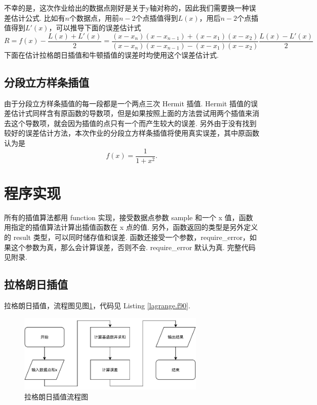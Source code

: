\documentclass{article}
\begin{document}
	不幸的是，这次作业给出的数据点刚好是关于y轴对称的，因此我们需要换一种误差估计公式. 比如有$n$个数据点，用前$n-2$个点插值得到$L(x)$，用后$n-2$个点插值得到$L'(x)$，可以推导下面的误差估计式
	\[
	R=f(x)-\frac{L(x)+L'(x)}{2}=\frac{(x-x_n)(x-x_{n-1})+(x-x_1)(x-x_2)}{(x-x_n)(x-x_{n-1})-(x-x_1)(x-x_2)}\frac{L(x)-L'(x)}{2}
	\]
	下面在估计拉格朗日插值和牛顿插值的误差时均使用这个误差估计式.
	\subsection{分段立方样条插值}
	由于分段立方样条插值的每一段都是一个两点三次 Hermit 插值. Hermit 插值的误差估计式同样含有原函数的导数项，但是如果按照上面的方法尝试用两个插值来消去这个导数项，就会因为插值的点只有一个而产生较大的误差. 另外由于没有找到较好的误差估计方法，本次作业的分段立方样条插值将使用真实误差，其中原函数认为是
	\[
	f(x)=\frac{1}{1+x^2}.
	\]
	
	\section{程序实现}
	所有的插值算法都用 function 实现，接受数据点参数 sample 和一个 x 值，函数用指定的插值算法计算出插值函数在 x 点的值. 另外，函数返回的类型是另外定义的 result 类型，可以同时储存值和误差. 函数还接受一个参数，require\_error，如果这个参数为真，那么会计算误差，否则不会. require\_error 默认为真. 完整代码见附录.
	\subsection{拉格朗日插值}
	拉格朗日插值，流程图见图\ref{fig:lagrange}，代码见 Listing \ref{lagrange.f90}.
	\begin{figure}[h!tb]
		\centering
		\includegraphics[width=0.8\textwidth]{./utils/lagrange.pdf}
		\caption{ 拉格朗日插值流程图\label{fig:lagrange}}
	\end{figure}
	
\end{document}
